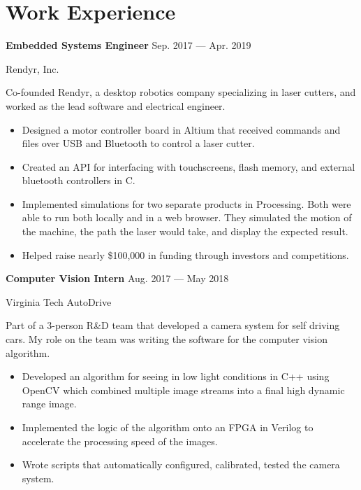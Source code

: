 \section{Work Experience}

\parbox[t][][t]{\linewidth}{
	\parbox{\linewidth}{\textbf{Embedded Systems Engineer}
		\hfill {{Sep. 2017 --- Apr. 2019}}}
	\smallbreak
	\parbox{\linewidth}{Rendyr, Inc.}
	
	\bigskip
	
	Co-founded Rendyr, a desktop robotics company specializing in laser cutters, and worked as the lead software and electrical engineer.
	
	\bigskip
	\begin{itemize}
		
		\item{Designed a motor controller board in Altium that received commands and files over USB and Bluetooth to control a laser cutter.}\\[-.6em]
		
		\item{Created an API for interfacing with touchscreens, flash memory, and external bluetooth controllers in C.}\\[-.6em]
		
		\item{Implemented simulations for two separate products in Processing. Both were able to run both locally and in a web browser. They simulated the motion of the machine, the path the laser would take, and display the expected result.}\\[-.6em]
		
		\item{Helped raise nearly \$100,000 in funding through investors and competitions.}
		
	\end{itemize}
	\bigskip
	\bigskip
}

\parbox[t][][t]{\linewidth}{
	\parbox{\linewidth}{\textbf{Computer Vision Intern}
		\hfill {{Aug. 2017 --- May 2018}}}
	\smallbreak
	\parbox{\linewidth}{Virginia Tech AutoDrive}
	
	\bigskip
	
	Part of a 3-person R\&D team that developed a camera system for self driving cars. My role on the team was writing the software for the computer vision algorithm.
	
	\bigskip
	\begin{itemize}
		\item{Developed an algorithm for seeing in low light conditions in C++ using OpenCV which combined multiple image streams into a final high dynamic range image.}\\[-.6em]
		
		\item{Implemented the logic of the algorithm onto an FPGA in Verilog to accelerate the processing speed of the images.}\\[-.6em]
		
		\item{Wrote scripts that automatically configured, calibrated, tested the camera system.}
		
	\end{itemize}
	\bigskip
	\bigskip
}

